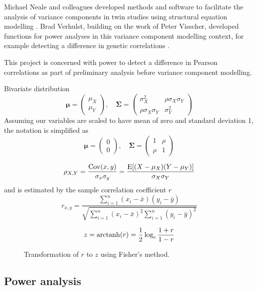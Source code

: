Michael Neale and colleagues developed methods and software to facilitate the analysis of variance components in twin studies using structural equation modelling \cite{Neale1992}.  Brad Verhulst, building on the work of Peter Visscher, developed functions for power analyses in this variance component modelling context, for example detecting a difference in genetic correlations \cite{Visscher2004,Visscher2008a}.

This project is concerned with power to detect a difference in Pearson correlations as part of preliminary analysis before variance component modelling.

Bivariate distribution
$$\boldsymbol\mu = \begin{pmatrix} \mu_X \\ \mu_Y \end{pmatrix}, \quad \boldsymbol\Sigma = \begin{pmatrix} \sigma_X^2 & \rho \sigma_X \sigma_Y \\ \rho \sigma_X \sigma_Y  & \sigma_Y^2 \end{pmatrix}$$
Assuming our variables are scaled to have mean of zero and standard deviation 1, the notation is simplified as
$$\boldsymbol\mu = \begin{pmatrix} 0 \\ 0 \end{pmatrix}, \quad \boldsymbol\Sigma = \begin{pmatrix} 1 & \rho \\ \rho  & 1 \end{pmatrix}$$
                             
$$\rho_{X,Y} = \frac{\mathrm{Cov}(x,y)}{\sigma_x \sigma_y} = \frac{\operatorname{E}[(X-\mu_X)(Y-\mu_Y)]}{\sigma_X\sigma_Y}$$
and is estimated by the sample correlation coefficient $r$
$$r_{x,y} = \frac{\sum_{i=1}^{n} (x_i - \bar{x})(y_i - \bar{y})}{\sqrt{\sum_{i=1}^{n} (x_i - \bar{x})^2 \sum_{i=1}^{n} (y_i - \bar{y})^2}}$$

$$z = \operatorname{arctanh}(r) = \frac{1}{2} \log_e \frac{1+r}{1-r}$$


\begin{figure}[htbp]
\sidecaption[t]
{}
\caption{Transformation of $r$ to $z$ using Fisher's method.}
\label{fig:ztransform}       %
\end{figure}




\subsection{Power analysis}

